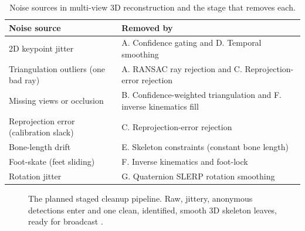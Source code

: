 \documentclass[oneside,openany]{book}
\begin{document}
\begin{table}[!h]
	\begin{center}
		\caption{Noise sources in multi-view 3D reconstruction and the stage that removes each.}
		\label{tab:noise}
		\footnotesize
		\begin{tabular}{p{6.0cm}p{8.0cm}}
			\toprule
			\textbf{Noise source} & \textbf{Removed by} \\
			\midrule
			2D keypoint jitter & A. Confidence gating and D. Temporal smoothing \\
			Triangulation outliers (one bad ray) & A. RANSAC ray rejection \cite{fischler1981ransac}
			and C. Reprojection-error rejection \\
			Missing views or occlusion & B. Confidence-weighted triangulation and F. inverse
			kinematics fill \\
			Reprojection error (calibration slack) & C. Reprojection-error rejection \\
			Bone-length drift & E. Skeleton constraints (constant bone length) \\
			Foot-skate (feet sliding) & F. Inverse kinematics and foot-lock \\
			Rotation jitter & G. Quaternion SLERP rotation smoothing \cite{shoemake1985slerp} \\
			\bottomrule
		\end{tabular}
	\end{center}
\end{table}

\begin{figure}[ht]
\begin{center}
\caption{The planned staged cleanup pipeline. Raw, jittery, anonymous detections enter and one
clean, identified, smooth 3D skeleton leaves, ready for broadcast
\cite{casiez2012oneeuro,savitzky1964golay}.}
\label{fig:noise}
\end{center}
\end{figure}
\end{document}

